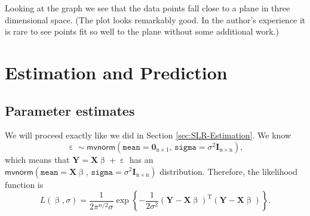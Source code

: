 \documentclass[captions=tableheading]{scrbook}
\begin{document}
Looking at the graph we see that the data points fall close to a plane in three dimensional space. (The plot looks remarkably good. In the author's experience it is rare to see points fit so well to the plane without some additional work.)
\section{Estimation and Prediction}
\label{sec-12-2}

\label{sec:Estimation-and-Prediction-MLR}
\subsection{Parameter estimates}
\label{sec-12-2-1}

\label{sub:mlr-parameter-estimates}

We will proceed exactly like we did in Section \ref{sec:SLR-Estimation}. We know
\begin{equation}
\upepsilon\sim\mathsf{mvnorm}\left(\mathtt{mean}=\mathbf{0}_{\mathrm{n}\times1},\,\mathtt{sigma}=\sigma^{2}\mathbf{I}_{\mathrm{n}\times\mathrm{n}}\right),
\end{equation}
which means that \(\mathbf{Y}=\mathbf{X}\upbeta+\upepsilon\) has an \(\mathsf{mvnorm}\left(\mathtt{mean}=\mathbf{X}\upbeta,\,\mathtt{sigma}=\sigma^{2}\mathbf{I}_{\mathrm{n}\times\mathrm{n}}\right)\) distribution. Therefore, the likelihood function is
\begin{equation}
L(\upbeta,\sigma)=\frac{1}{2\pi^{n/2}\sigma}\exp\left\{ -\frac{1}{2\sigma^{2}}\left(\mathbf{Y}-\mathbf{X}\upbeta\right)^{\mathrm{T}}\left(\mathbf{Y}-\mathbf{X}\upbeta\right)\right\}.
\end{equation}
\end{document}
